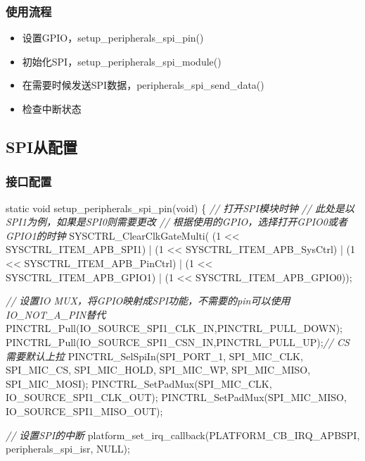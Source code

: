\documentclass[
  12pt,
]{book}
\newenvironment{Shaded}{\begin{snugshade}}{\end{snugshade}}
\newcommand{\CommentTok}[1]{\textcolor[rgb]{0.56,0.35,0.01}{\textit{#1}}}
\newcommand{\DataTypeTok}[1]{\textcolor[rgb]{0.13,0.29,0.53}{#1}}
\newcommand{\DecValTok}[1]{\textcolor[rgb]{0.00,0.00,0.81}{#1}}
\newcommand{\NormalTok}[1]{#1}
\providecommand{\tightlist}{%
  \setlength{\itemsep}{0pt}\setlength{\parskip}{0pt}}
\begin{document}
\hypertarget{ux4f7fux7528ux6d41ux7a0b-12}{%
\subsubsection{使用流程}\label{ux4f7fux7528ux6d41ux7a0b-12}}

\begin{itemize}
\tightlist
\item
  设置GPIO，setup\_peripherals\_spi\_pin()
\item
  初始化SPI，setup\_peripherals\_spi\_module()
\item
  在需要时候发送SPI数据，peripherals\_spi\_send\_data()
\item
  检查中断状态
\end{itemize}

\hypertarget{spiux4eceux914dux7f6e-2}{%
\subsection{SPI从配置}\label{spiux4eceux914dux7f6e-2}}

\hypertarget{ux63a5ux53e3ux914dux7f6e-5}{%
\subsubsection{接口配置}\label{ux63a5ux53e3ux914dux7f6e-5}}

\begin{Shaded}
\begin{Highlighting}[]
\DataTypeTok{static} \DataTypeTok{void}\NormalTok{ setup_peripherals_spi_pin(}\DataTypeTok{void}\NormalTok{)}
\NormalTok{\{}
    \CommentTok{// 打开SPI模块时钟}
    \CommentTok{// 此处是以SPI1为例，如果是SPI0则需要更改}
    \CommentTok{// 根据使用的GPIO，选择打开GPIO0或者GPIO1的时钟}
\NormalTok{    SYSCTRL_ClearClkGateMulti(    (}\DecValTok{1}\NormalTok{ << SYSCTRL_ITEM_APB_SPI1)}
\NormalTok{                                | (}\DecValTok{1}\NormalTok{ << SYSCTRL_ITEM_APB_SysCtrl)}
\NormalTok{                                | (}\DecValTok{1}\NormalTok{ << SYSCTRL_ITEM_APB_PinCtrl)}
\NormalTok{                                | (}\DecValTok{1}\NormalTok{ << SYSCTRL_ITEM_APB_GPIO1)}
\NormalTok{                                | (}\DecValTok{1}\NormalTok{ << SYSCTRL_ITEM_APB_GPIO0));}

    \CommentTok{// 设置IO MUX，将GPIO映射成SPI功能，不需要的pin可以使用IO_NOT_A_PIN替代}
\NormalTok{    PINCTRL_Pull(IO_SOURCE_SPI1_CLK_IN,PINCTRL_PULL_DOWN);}
\NormalTok{    PINCTRL_Pull(IO_SOURCE_SPI1_CSN_IN,PINCTRL_PULL_UP);}\CommentTok{// CS 需要默认上拉}
\NormalTok{    PINCTRL_SelSpiIn(SPI_PORT_1, SPI_MIC_CLK, SPI_MIC_CS, SPI_MIC_HOLD, SPI_MIC_WP, SPI_MIC_MISO, SPI_MIC_MOSI);}
\NormalTok{    PINCTRL_SetPadMux(SPI_MIC_CLK, IO_SOURCE_SPI1_CLK_OUT);}
\NormalTok{    PINCTRL_SetPadMux(SPI_MIC_MISO, IO_SOURCE_SPI1_MISO_OUT);}
    
    \CommentTok{// 设置SPI的中断}
\NormalTok{    platform_set_irq_callback(PLATFORM_CB_IRQ_APBSPI, peripherals_spi_isr, NULL);}
\end{Highlighting}
\end{Shaded}
\end{document}
